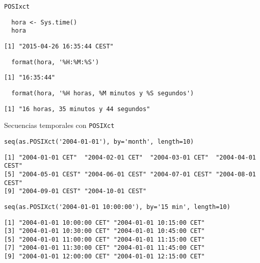 \documentclass[xcolor={usenames,svgnames,dvipsnames}]{beamer}
\begin{document}
\begin{frame}[fragile,label=sec-2-4]{\texttt{POSIxct}}
 \lstset{language=R,label= ,caption= ,numbers=none}
\begin{lstlisting}
  hora <- Sys.time()
  hora
\end{lstlisting}

\begin{verbatim}
[1] "2015-04-26 16:35:44 CEST"
\end{verbatim}

\lstset{language=R,label= ,caption= ,numbers=none}
\begin{lstlisting}
  format(hora, '%H:%M:%S')
\end{lstlisting}

\begin{verbatim}
[1] "16:35:44"
\end{verbatim}

\lstset{language=R,label= ,caption= ,numbers=none}
\begin{lstlisting}
  format(hora, '%H horas, %M minutos y %S segundos')
\end{lstlisting}

\begin{verbatim}
[1] "16 horas, 35 minutos y 44 segundos"
\end{verbatim}
\end{frame}

\begin{frame}[fragile,label=sec-2-5]{Secuencias temporales con \texttt{POSIXct}}
 \lstset{language=R,label= ,caption= ,numbers=none}
\begin{lstlisting}
seq(as.POSIXct('2004-01-01'), by='month', length=10)
\end{lstlisting}

\begin{verbatim}
[1] "2004-01-01 CET"  "2004-02-01 CET"  "2004-03-01 CET"  "2004-04-01 CEST"
[5] "2004-05-01 CEST" "2004-06-01 CEST" "2004-07-01 CEST" "2004-08-01 CEST"
[9] "2004-09-01 CEST" "2004-10-01 CEST"
\end{verbatim}

\lstset{language=R,label= ,caption= ,numbers=none}
\begin{lstlisting}
seq(as.POSIXct('2004-01-01 10:00:00'), by='15 min', length=10)
\end{lstlisting}

\begin{verbatim}
[1] "2004-01-01 10:00:00 CET" "2004-01-01 10:15:00 CET"
[3] "2004-01-01 10:30:00 CET" "2004-01-01 10:45:00 CET"
[5] "2004-01-01 11:00:00 CET" "2004-01-01 11:15:00 CET"
[7] "2004-01-01 11:30:00 CET" "2004-01-01 11:45:00 CET"
[9] "2004-01-01 12:00:00 CET" "2004-01-01 12:15:00 CET"
\end{verbatim}
\end{frame}
\end{document}
